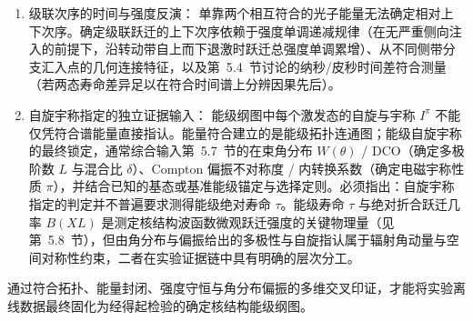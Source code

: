 \begin{enumerate}
\item 级联次序的时间与强度反演：
单靠两个相互符合的光子能量无法确定相对上下次序。确定级联跃迁的上下次序依赖于强度单调递减规律（在无严重侧向注入的前提下，沿转动带自上而下退激时跃迁总强度单调累增）、从不同侧带分支汇入点的几何连接特征，以及第~5.4~节讨论的纳秒/皮秒时间差符合测量（若两态寿命差异足以在符合时间谱上分辨因果先后）。
\item 自旋宇称指定的独立证据输入：
能级纲图中每个激发态的自旋与宇称 $I^\pi$ 不能仅凭符合谱能量直接指认。能量符合建立的是能级拓扑连通图；能级自旋宇称的最终锁定，通常综合输入第~5.7~节的在束角分布 $W(\theta)$ / DCO（确定多极阶数 $L$ 与混合比 $\delta$）、Compton 偏振不对称度 / 内转换系数（确定电磁宇称性质 $\pi$），并结合已知的基态或基准能级锚定与选择定则。必须指出：自旋宇称指定的判定并不普遍要求测得能级绝对寿命 $\tau$。能级寿命 $\tau$ 与绝对折合跃迁几率 $B(XL)$ 是测定核结构波函数微观跃迁强度的关键物理量（见第~5.8~节），但由角分布与偏振给出的多极性与自旋指认属于辐射角动量与空间对称性约束，二者在实验证据链中具有明确的层次分工。
\end{enumerate}
通过符合拓扑、能量封闭、强度守恒与角分布偏振的多维交叉印证，才能将实验离线数据最终固化为经得起检验的确定核结构能级纲图。
